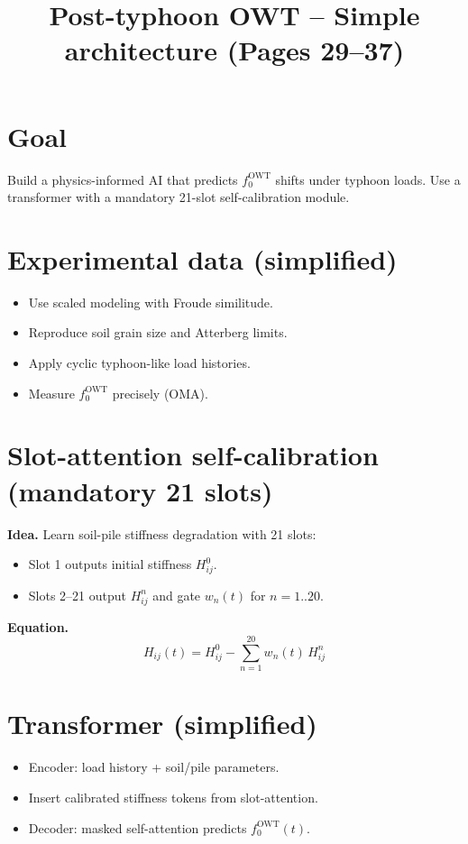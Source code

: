 \documentclass[11pt]{article}
\title{Post-typhoon OWT -- Simple architecture (Pages 29--37)}
\author{}
\date{}
\begin{document}
\maketitle

\section{Goal}
Build a physics-informed AI that predicts $f_0^{\mathrm{OWT}}$ shifts under typhoon loads.
Use a transformer with a mandatory 21-slot self-calibration module.

\section{Experimental data (simplified)}
\begin{itemize}
  \item Use scaled modeling with Froude similitude.
  \item Reproduce soil grain size and Atterberg limits.
  \item Apply cyclic typhoon-like load histories.
  \item Measure $f_0^{\mathrm{OWT}}$ precisely (OMA).
\end{itemize}

\section{Slot-attention self-calibration (mandatory 21 slots)}
\textbf{Idea.} Learn soil-pile stiffness degradation with 21 slots:
\begin{itemize}
  \item Slot 1 outputs initial stiffness $H_{ij}^0$.
  \item Slots 2--21 output $H_{ij}^n$ and gate $w_n(t)$ for $n=1..20$.
\end{itemize}

\textbf{Equation.}
\begin{equation}
H_{ij}(t) = H_{ij}^0 - \sum_{n=1}^{20} w_n(t)\,H_{ij}^n
\end{equation}

\section{Transformer (simplified)}
\begin{itemize}
  \item Encoder: load history + soil/pile parameters.
  \item Insert calibrated stiffness tokens from slot-attention.
  \item Decoder: masked self-attention predicts $f_0^{\mathrm{OWT}}(t)$.
\end{itemize}
\end{document}
